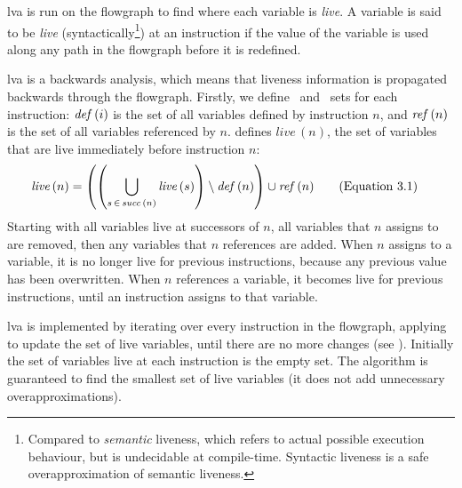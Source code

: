 \documentclass[00-main.tex]{subfiles}
\begin{document}

\Gls{lva} is run on the flowgraph to find where each variable is \emph{live}.
A variable is said to be \emph{live} (syntactically\footnote{Compared to \emph{semantic} liveness, which refers to actual possible execution behaviour, but is undecidable at compile-time. Syntactic liveness is a safe overapproximation of semantic liveness.}) at an instruction if the value of the variable is used along any path in the flowgraph before it is redefined.

\Gls{lva} is a backwards analysis, which means that liveness information is propagated backwards through the flowgraph.
Firstly, we define \lvadef\ and \lvaref\ sets for each instruction: $\mathit{def}\,(i)$ is the set of all variables defined by instruction $n$, and $\mathit{ref}\,(n)$ is the set of all variables referenced by $n$.
 defines $\mathit{live}\,(n)$, the set of variables that are live immediately before instruction $n$:
\begin{align}\label{eq:live vars}
  \mathit{live}\,(n) &= \left( \left( \bigcup_{s \,\in\, \mathit{succ}\,(n)} \mathit{live}\,(s) \right) \setminus \mathit{def}\,(n) \right) \cup \mathit{ref}\,(n)
  \tag{Equation~3.1}
\end{align}
Starting with all variables live at successors of $n$, all variables that $n$ assigns to are removed, then any variables that $n$ references are added.
When $n$ assigns to a variable, it is no longer live for previous instructions, because any previous value has been overwritten.
When $n$ references a variable, it becomes live for previous instructions, until an instruction assigns to that variable.

\gls{lva} is implemented by iterating over every instruction in the flowgraph, applying  to update the set of live variables, until there are no more changes (see ).
Initially the set of variables live at each instruction is the empty set.
The algorithm is guaranteed to find the smallest set of live variables (it does not add unnecessary overapproximations).
\end{document}
